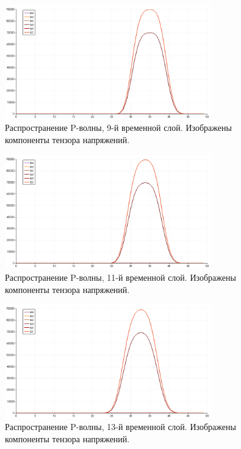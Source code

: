 \begin{figure}[htp]
\centering
\includegraphics[width=0.8\textwidth]{png/p-wave-test/s/0009.png}
\caption{Распространение P-волны, 9-й временной слой. Изображены компоненты тензора напряжений.}
\end{figure}

\begin{figure}[htp]
\centering
\includegraphics[width=0.8\textwidth]{png/p-wave-test/s/0011.png}
\caption{Распространение P-волны, 11-й временной слой. Изображены компоненты тензора напряжений.}
\end{figure}

\begin{figure}[htp]
\centering
\includegraphics[width=0.8\textwidth]{png/p-wave-test/s/0013.png}
\caption{Распространение P-волны, 13-й временной слой. Изображены компоненты тензора напряжений.}
\end{figure}

